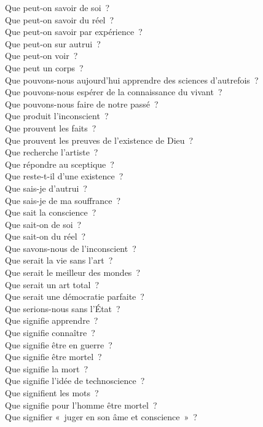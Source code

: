 \documentclass[a4paper,12pt]{article}
\begin{document}
Que peut-on savoir de soi ? \\
Que peut-on savoir du réel ? \\
Que peut-on savoir par expérience ? \\
Que peut-on sur autrui ? \\
Que peut-on voir ? \\
Que peut un corps ? \\
Que pouvons-nous aujourd'hui apprendre des sciences d'autrefois ? \\
Que pouvons-nous espérer de la connaissance du vivant ? \\
Que pouvons-nous faire de notre passé ? \\
Que produit l'inconscient ? \\
Que prouvent les faits ? \\
Que prouvent les preuves de l'existence de Dieu ? \\
Que recherche l'artiste ? \\
Que répondre au sceptique ? \\
Que reste-t-il d'une existence ? \\
Que sais-je d'autrui ? \\
Que sais-je de ma souffrance ? \\
Que sait la conscience ? \\
Que sait-on de soi ? \\
Que sait-on du réel ? \\
Que savons-nous de l'inconscient ? \\
Que serait la vie sans l'art ? \\
Que serait le meilleur des mondes ? \\
Que serait un art total ? \\
Que serait une démocratie parfaite ? \\
Que serions-nous sans l'État ? \\
Que signifie apprendre ? \\
Que signifie connaître ? \\
Que signifie être en guerre ? \\
Que signifie être mortel ? \\
Que signifie la mort ? \\
Que signifie l'idée de technoscience ? \\
Que signifient les mots ? \\
Que signifie pour l'homme être mortel ? \\
Que signifier « juger en son âme et conscience » ? \\
\end{document}
